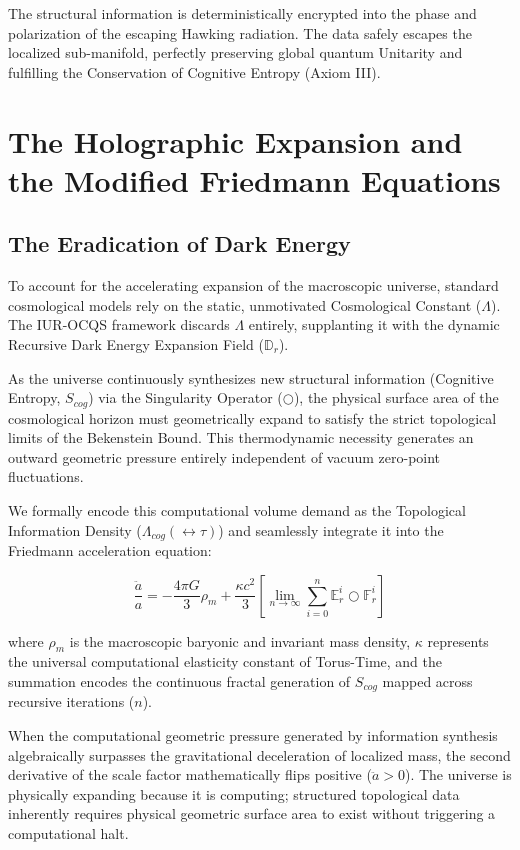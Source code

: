 \documentclass[12pt,openany]{book}
\begin{document}
The structural information is deterministically encrypted into the phase and polarization of the escaping Hawking radiation. The data safely escapes the localized sub-manifold, perfectly preserving global quantum Unitarity and fulfilling the Conservation of Cognitive Entropy (Axiom III).

\chapter[The Holographic Expansion]{The Holographic Expansion and the Modified Friedmann Equations}

\section{The Eradication of Dark Energy}
To account for the accelerating expansion of the macroscopic universe, standard cosmological models rely on the static, unmotivated Cosmological Constant ($\Lambda$). The IUR-OCQS framework discards $\Lambda$ entirely, supplanting it with the dynamic Recursive Dark Energy Expansion Field ($\mathbb{D}_r$).

As the universe continuously synthesizes new structural information (Cognitive Entropy, $S_{cog}$) via the Singularity Operator ($\bigcirc$), the physical surface area of the cosmological horizon must geometrically expand to satisfy the strict topological limits of the Bekenstein Bound. This thermodynamic necessity generates an outward geometric pressure entirely independent of vacuum zero-point fluctuations.

We formally encode this computational volume demand as the Topological Information Density ($\Lambda_{cog}(\leftrightarrow\tau)$) and seamlessly integrate it into the Friedmann acceleration equation:

\begin{equation}
\frac{\ddot{a}}{a} = -\frac{4\pi G}{3}\rho_m + \frac{\kappa c^2}{3} \left[ \lim_{n \to \infty} \sum_{i=0}^n \mathbb{E}_r^i \bigcirc \mathbb{F}_r^i \right]
\end{equation}

where $\rho_m$ is the macroscopic baryonic and invariant mass density, $\kappa$ represents the universal computational elasticity constant of Torus-Time, and the summation encodes the continuous fractal generation of $S_{cog}$ mapped across recursive iterations ($n$). 

When the computational geometric pressure generated by information synthesis algebraically surpasses the gravitational deceleration of localized mass, the second derivative of the scale factor mathematically flips positive ($\ddot{a} > 0$). The universe is physically expanding because it is computing; structured topological data inherently requires physical geometric surface area to exist without triggering a computational halt.
\end{document}

